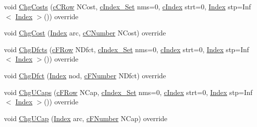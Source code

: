 \begin{DoxyCompactItemize}
\item 
void \mbox{\hyperlink{class_s_p_tree_a8f213278dffbfd9008e7c175951c1d89}{Chg\+Costs}} (\mbox{\hyperlink{class_m_c_f_class_ab700102e9ba8bb6015be6818d4e99097}{c\+C\+Row}} N\+Cost, \mbox{\hyperlink{class_m_c_f_class_a81575b2d4e4d5636b17170432150ae69}{c\+Index\+\_\+\+Set}} nms=0, \mbox{\hyperlink{class_m_c_f_class_a76aaabb20535c51a2752b93f6c38fe54}{c\+Index}} strt=0, \mbox{\hyperlink{class_m_c_f_class_ad53d6229d7ec28555a9c9c2fd9abf773}{Index}} stp=Inf$<$ \mbox{\hyperlink{class_m_c_f_class_ad53d6229d7ec28555a9c9c2fd9abf773}{Index}} $>$()) override
\item 
void \mbox{\hyperlink{class_s_p_tree_a5b694b932ddb1fc61d9f3d66aaca10e1}{Chg\+Cost}} (\mbox{\hyperlink{class_m_c_f_class_ad53d6229d7ec28555a9c9c2fd9abf773}{Index}} arc, \mbox{\hyperlink{class_m_c_f_class_a07dbefeeb08c3f63073622411893eb76}{c\+C\+Number}} N\+Cost) override
\item 
void \mbox{\hyperlink{class_s_p_tree_a6e7e9247b7aecfa1934da70f2e525295}{Chg\+Dfcts}} (\mbox{\hyperlink{class_m_c_f_class_ad325f3193dbba0ddef1da4e72d29eda6}{c\+F\+Row}} N\+Dfct, \mbox{\hyperlink{class_m_c_f_class_a81575b2d4e4d5636b17170432150ae69}{c\+Index\+\_\+\+Set}} nms=0, \mbox{\hyperlink{class_m_c_f_class_a76aaabb20535c51a2752b93f6c38fe54}{c\+Index}} strt=0, \mbox{\hyperlink{class_m_c_f_class_ad53d6229d7ec28555a9c9c2fd9abf773}{Index}} stp=Inf$<$ \mbox{\hyperlink{class_m_c_f_class_ad53d6229d7ec28555a9c9c2fd9abf773}{Index}} $>$()) override
\item 
void \mbox{\hyperlink{class_s_p_tree_accd5dce260eb9999c08e5749b693b5f4}{Chg\+Dfct}} (\mbox{\hyperlink{class_m_c_f_class_ad53d6229d7ec28555a9c9c2fd9abf773}{Index}} nod, \mbox{\hyperlink{class_m_c_f_class_a11f747fbdff346237c8db4469d569994}{c\+F\+Number}} N\+Dfct) override
\item 
void \mbox{\hyperlink{class_s_p_tree_a38b4cffe29b722d2552f11022a78227d}{Chg\+U\+Caps}} (\mbox{\hyperlink{class_m_c_f_class_ad325f3193dbba0ddef1da4e72d29eda6}{c\+F\+Row}} N\+Cap, \mbox{\hyperlink{class_m_c_f_class_a81575b2d4e4d5636b17170432150ae69}{c\+Index\+\_\+\+Set}} nms=0, \mbox{\hyperlink{class_m_c_f_class_a76aaabb20535c51a2752b93f6c38fe54}{c\+Index}} strt=0, \mbox{\hyperlink{class_m_c_f_class_ad53d6229d7ec28555a9c9c2fd9abf773}{Index}} stp=Inf$<$ \mbox{\hyperlink{class_m_c_f_class_ad53d6229d7ec28555a9c9c2fd9abf773}{Index}} $>$()) override
\item 
void \mbox{\hyperlink{class_s_p_tree_a00e86718fdd12d417a945d7e146d5b4d}{Chg\+U\+Cap}} (\mbox{\hyperlink{class_m_c_f_class_ad53d6229d7ec28555a9c9c2fd9abf773}{Index}} arc, \mbox{\hyperlink{class_m_c_f_class_a11f747fbdff346237c8db4469d569994}{c\+F\+Number}} N\+Cap) override

\end{DoxyCompactItemize}
